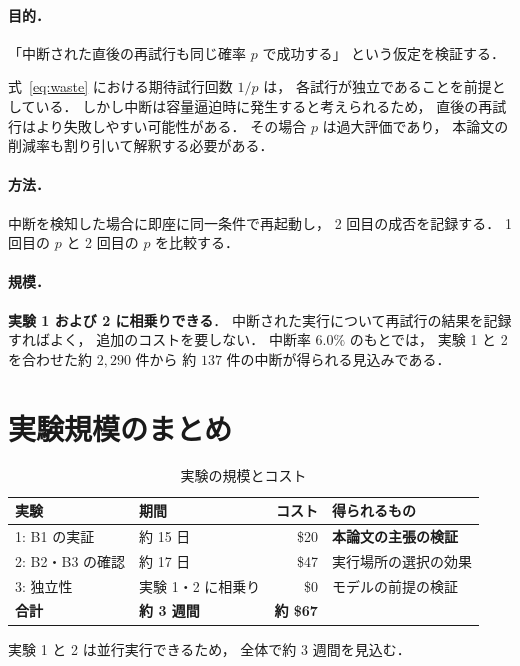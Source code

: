 \documentclass[11pt,a4paper]{ltjsreport}
\begin{document}
\paragraph{目的．}
「中断された直後の再試行も同じ確率 $p$ で成功する」
という仮定を検証する．

式~\eqref{eq:waste} における期待試行回数 $1/p$ は，
各試行が独立であることを前提としている．
しかし中断は容量逼迫時に発生すると考えられるため，
直後の再試行はより失敗しやすい可能性がある．
その場合 $p$ は過大評価であり，
本論文の削減率も割り引いて解釈する必要がある．

\paragraph{方法．}
中断を検知した場合に即座に同一条件で再起動し，
2 回目の成否を記録する．
1 回目の $p$ と 2 回目の $p$ を比較する．

\paragraph{規模．}
\textbf{実験 1 および 2 に相乗りできる}．
中断された実行について再試行の結果を記録すればよく，
追加のコストを要しない．
中断率 $6.0\%$ のもとでは，
実験 1 と 2 を合わせた約 $2{,}290$ 件から
約 $137$ 件の中断が得られる見込みである．

\section{実験規模のまとめ}

\begin{table}[htbp]
\centering
\caption{実験の規模とコスト}
\label{tab:exp_scale}
\small
\begin{tabularx}{\textwidth}{@{}llrX@{}}
\toprule
実験 & 期間 & コスト & 得られるもの \\
\midrule
1: B1 の実証 & 約 15 日 & \$20 & \textbf{本論文の主張の検証} \\
2: B2・B3 の確認 & 約 17 日 & \$47 & 実行場所の選択の効果 \\
3: 独立性 & 実験 1・2 に相乗り & \$0 & モデルの前提の検証 \\
\midrule
\textbf{合計} & \textbf{約 3 週間} & \textbf{約 \$67} & \\
\bottomrule
\end{tabularx}
\end{table}

実験 1 と 2 は並行実行できるため，
全体で約 3 週間を見込む．
\end{document}
